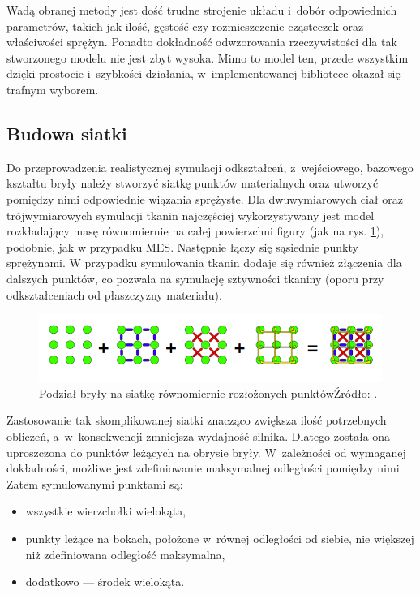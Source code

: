 Wadą obranej metody jest dość trudne strojenie układu i~dobór odpowiednich parametrów, takich jak ilość, gęstość czy rozmieszczenie cząsteczek oraz właściwości sprężyn. Ponadto dokładność odwzorowania rzeczywistości dla tak stworzonego modelu nie jest zbyt wysoka. Mimo to model ten, przede wszystkim dzięki prostocie i~szybkości działania, w~implementowanej bibliotece okazał się trafnym wyborem.

\subsection{Budowa siatki}
\label{part:budowa-siatki}
Do przeprowadzenia realistycznej symulacji odkształceń, z~wejściowego, bazowego kształtu bryły należy stworzyć siatkę punktów materialnych oraz utworzyć pomiędzy nimi odpowiednie wiązania sprężyste. Dla dwuwymiarowych ciał oraz trójwymiarowych symulacji tkanin najczęściej wykorzystywany jest model rozkładający masę równomiernie na całej powierzchni figury (jak na rys. \ref{fig:pointmassesgrid}), podobnie, jak w przypadku MES. Następnie łączy się sąsiednie punkty sprężynami. W przypadku symulowania tkanin dodaje się również złączenia dla dalszych punktów, co pozwala na symulację sztywności tkaniny (oporu przy odkształceniach od płaszczyzny materiału).

\begin{figure}[ht]
	\centering
	\includegraphics[width=0.7\linewidth]{images/pointmassesgrid}
	\caption[Podział bryły na siatkę równomiernie rozłożonych punktów]{Podział bryły na siatkę równomiernie rozłożonych punktów\newline Źródło: \cite{bib:realtime-physics}.}
	\label{fig:pointmassesgrid}
\end{figure}

Zastosowanie tak skomplikowanej siatki znacząco zwiększa ilość potrzebnych obliczeń, a~w~konsekwencji zmniejsza wydajność silnika. Dlatego została ona uproszczona do punktów leżących na obrysie bryły. W~zależności od wymaganej dokładności, możliwe jest zdefiniowanie maksymalnej odległości pomiędzy nimi. Zatem symulowanymi punktami są:
\begin{itemize}
	\item wszystkie wierzchołki wielokąta,
	\item punkty leżące na bokach, położone w~równej odległości od siebie, nie większej niż zdefiniowana odległość maksymalna,
	\item dodatkowo --- środek wielokąta.
\end{itemize}

